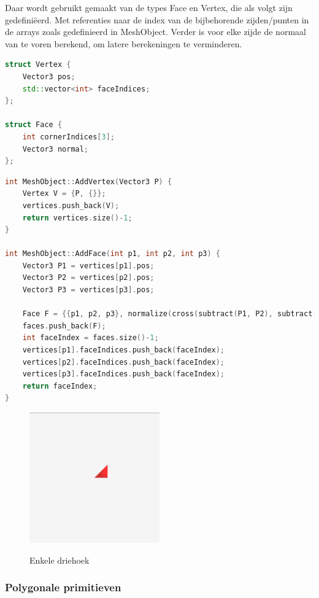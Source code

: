 \documentclass[12pt, a4paper]{article}
\begin{document}
Daar wordt gebruikt gemaakt van de types Face en Vertex, die als volgt zijn gedefiniëerd. Met referenties naar de index van de bijbehorende zijden/punten in de arrays zoals gedefinieerd in MeshObject. Verder is voor elke zijde de normaal van te voren berekend, om latere berekeningen te verminderen.

\begin{lstlisting}[language=c++]
struct Vertex {
	Vector3 pos;
	std::vector<int> faceIndices;
};

struct Face {
	int cornerIndices[3];
	Vector3 normal;
};
\end{lstlisting}

\begin{lstlisting}[language=c++]
int MeshObject::AddVertex(Vector3 P) {
	Vertex V = {P, {}};
	vertices.push_back(V);
	return vertices.size()-1;
}

int MeshObject::AddFace(int p1, int p2, int p3) {
	Vector3 P1 = vertices[p1].pos;
	Vector3 P2 = vertices[p2].pos;
	Vector3 P3 = vertices[p3].pos;
	
	Face F = {{p1, p2, p3}, normalize(cross(subtract(P1, P2), subtract(P1, P3)))};
	faces.push_back(F);
	int faceIndex = faces.size()-1;
	vertices[p1].faceIndices.push_back(faceIndex);
	vertices[p2].faceIndices.push_back(faceIndex);
	vertices[p3].faceIndices.push_back(faceIndex);
	return faceIndex;
}
\end{lstlisting}

\begin{figure}[H]
	\centering
	\includegraphics[width=0.50\textwidth]{renders/tri.png}
	\label{fig:tri}
	\caption{Enkele driehoek}
\end{figure}

\subsubsection{Polygonale primitieven}
\end{document}
